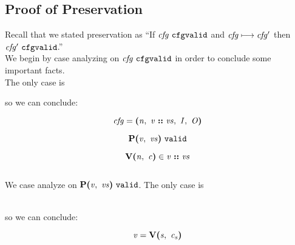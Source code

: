 \documentclass[12pt]{article}
\begin{document}
\subsection{Proof of Preservation}

Recall that we stated preservation as ``If $\cfgvalid{\nterm{cfg}}$ and
$\steps{\nterm{cfg}}{\nterm{cfg'}}$ then $\cfgvalid{\nterm{cfg'}}$.''\\

We begin by case analyzing on $\cfgvalid{\nterm{cfg}}$ in order to conclude some
important facts.\\

The only case is
\begin{mathpar}
\end{mathpar}

so we can conclude:

\begin{equation}
  \nterm{cfg} =
  \cfg{\nterm{n}}{\cons{\nterm{v}}{\nterm{vs}}}{\nterm{I}}{\nterm{O}}
\end{equation}

\begin{equation}
  \valid{\prog{\nterm{v}}{\nterm{vs}}}
\end{equation}

\begin{equation}
  \ver{\nterm{n}}{\nterm{c}} \in \nterm{\cons{\nterm{v}}{\nterm{vs}}}
\end{equation}
\\

We case analyze on $\valid{\prog{\nterm{v}}{\nterm{vs}}}$. The only case is

\begin{mathpar}
\end{mathpar}
\\

so we can conclude:

\begin{equation}
  \nterm{v} = \ver{\nterm{s}}{\nterm{c_s}}
\end{equation}
\end{document}
